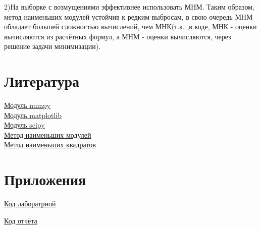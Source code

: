 \documentclass[a4]{article}
\begin{document}
		2)На выборке с возмущениями эффективнее использовать МНМ. Таким образом, метод наименьших модулей устойчив к редким выбросам, в свою очередь МНМ обладает большей сложностью вычислений, чем МНК(т.к. ,в коде, МНК - оценки вычисляются из расчётных формул, а МНМ - оценки вычисляются, через решение задачи минимизации).
		
	\section{Литература}
	
	\href{https://physics.susu.ru/vorontsov/language/numpy.html}{Модуль numpy}\\
	
	\href{https://matplotlib.org/}{Модуль matplotlib}\\
	
	\href{https://www.scipy.org/}{Модуль scipy}\\
	
	\href{https://ru.wikipedia.org/wiki/%D0%9C%D0%B5%D1%82%D0%BE%D0%B4_%D0%BD%D0%B0%D0%B8%D0%BC%D0%B5%D0%BD%D1%8C%D1%88%D0%B8%D1%85_%D0%BC%D0%BE%D0%B4%D1%83%D0%BB%D0%B5%D0%B9}{Метод наименьших модулей}\\
	
	\href{https://ru.wikipedia.org/wiki/%D0%9C%D0%B5%D1%82%D0%BE%D0%B4_%D0%BD%D0%B0%D0%B8%D0%BC%D0%B5%D0%BD%D1%8C%D1%88%D0%B8%D1%85_%D0%BA%D0%B2%D0%B0%D0%B4%D1%80%D0%B0%D1%82%D0%BE%D0%B2}{Метод наименьших квадратов}\\
	
	\section{Приложения}
	
	\href{https://github.com/LuciusGen/Matstat/blob/master/Lab6/Lab6.py}{Код лаборатрной}
	
	\href{https://github.com/LuciusGen/Matstat/blob/master/Lab6/lab6.tex}{Код отчёта}
	
\end{document}
